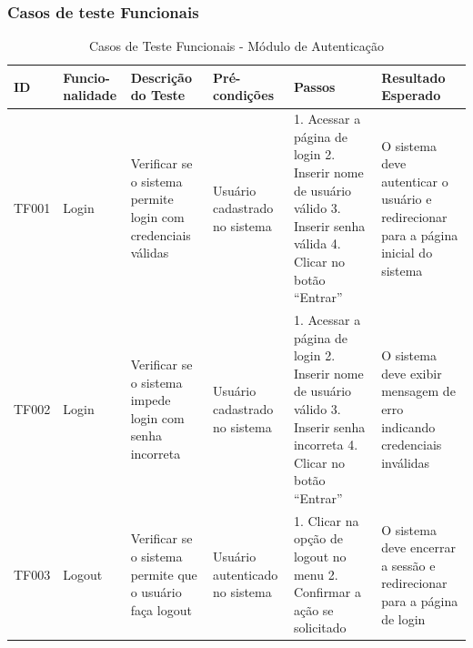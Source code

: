 \documentclass[
	12pt,				%
	openany,			%
	twoside,			%
	a4paper,			%
	english,			%
	brazil				%
	]{abntex2}
\begin{document}
\newpage

\subsubsection{Casos de teste Funcionais}
\begin{table}[htbp]

\caption{Casos de Teste Funcionais - Módulo de Autenticação}
\begin{tabular}{|p{1cm}|p{1.6cm}|p{3.3cm}|p{2.3cm}|p{3.5cm}|p{3.5cm}|}
\hline
\textbf{ID} & \textbf{Funcio-nalidade} & \textbf{Descrição do Teste} & \textbf{Pré-condições} & \textbf{Passos} & \textbf{Resultado Esperado} \\
\hline
TF001 & Login & Verificar se o sistema permite login com credenciais válidas & Usuário cadastrado no sistema & 
1. Acessar a página de login
2. Inserir nome de usuário válido
3. Inserir senha válida
4. Clicar no botão ``Entrar'' & 
O sistema deve autenticar o usuário e redirecionar para a página inicial do sistema \\
\hline
TF002 & Login & Verificar se o sistema impede login com senha incorreta & Usuário cadastrado no sistema & 
1. Acessar a página de login
2. Inserir nome de usuário válido
3. Inserir senha incorreta
4. Clicar no botão ``Entrar'' & 
O sistema deve exibir mensagem de erro indicando credenciais inválidas \\
\hline
TF003 & Logout & Verificar se o sistema permite que o usuário faça logout & Usuário autenticado no sistema & 
1. Clicar na opção de logout no menu
2. Confirmar a ação se solicitado & 
O sistema deve encerrar a sessão e redirecionar para a página de login \\
\hline
\end{tabular}
\end{table}

\FloatBarrier
\end{document}
